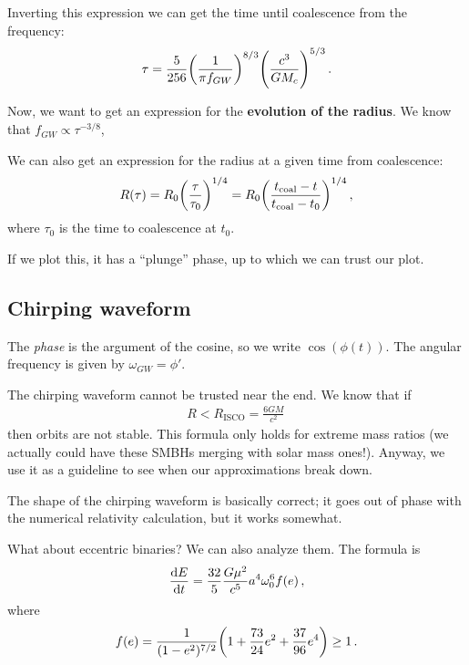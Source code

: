 \documentclass[main.tex]{subfiles}
\begin{document}

Inverting this expression we can get the time until coalescence from the frequency: 
%
\begin{align}
\tau = \frac{5}{256} \qty( \frac{1}{\pi f_{GW}})^{8/3} \qty( \frac{c^3}{G M_c})^{5/3}
\,.
\end{align}

Now, we want to get an expression for the \textbf{evolution of the radius}. We know that \(f_{GW} \propto \tau^{-3/8}\), 

We can also get an expression for the radius at a given time from coalescence: 
%
\begin{align}
R(\tau ) = R_0 \qty(\frac{\tau }{\tau_0 })^{1/4} = R_0 \qty(\frac{t _{\text{coal}} - t}{t _{\text{coal}} - t_0 })^{1/4}
\,,
\end{align}
%
where \(\tau_0 \) is the time to coalescence at \(t_0 \).

If we plot this, it has a ``plunge'' phase, up to which we can trust our plot. 

\subsection{Chirping waveform}

The \emph{phase} is the argument of the cosine, so we write \(\cos(\phi (t))\). 
The angular frequency is given by \(\omega_{GW} = \phi'\).

The chirping waveform cannot be trusted near the end. 
We know that if 
%
\begin{align}
R < R _{\text{ISCO}} = \frac{6GM}{c^2}
\,
\end{align}
%
then orbits are not stable. This formula only holds for extreme mass ratios (we actually could have these SMBHs merging with solar mass ones!). 
Anyway, we use it as a guideline to see when our approximations break down. 

The shape of the chirping waveform is basically correct; it goes out of phase with the numerical relativity calculation, but it works somewhat. 


What about eccentric binaries? 
We can also analyze them. The formula is 
%
\begin{align}
\dv{E}{t} = \frac{32}{5} \frac{G \mu^2}{c^{5}} a^{4} \omega_0^{6} f(e)
\,,
\end{align}
%
where 
%
\begin{align}
f(e) = \frac{1}{(1 - e^2)^{7/2}} \qty(1 + \frac{73}{24} e^2 + \frac{37}{96} e^{4}) \geq 1 
\,.
\end{align}
\end{document}
